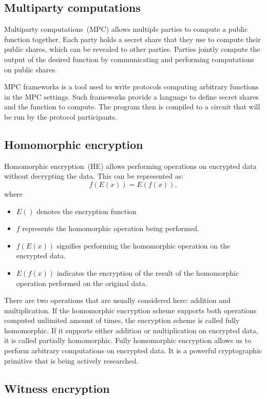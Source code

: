 \documentclass[
    9pt,            %
    report,        %
    affiltop,       %
]{art}
\begin{document}
\subsection{Multiparty computations}\label{MPC}

Multiparty computations~(MPC) allows multiple parties to compute a public function together. Each party holds a secret share that they use to compute their public shares, which can be revealed to other parties. Parties jointly compute the output of the desired function by communicating and performing computations on public shares.

MPC frameworks is a tool used to write protocols computing arbitrary functions in the MPC settings. Such frameworks provide a language to define secret shares and the function to compute. The program then is compiled to a circuit that will be run by the protocol participants.

\subsection{Homomorphic encryption}\label{HE}

Homomorphic encryption~(HE) allows performing operations on encrypted data without decrypting the data. This can be represented as: 
$$f(E(x)) = E(f(x)),$$ 
where
\begin{itemize}
\item $E()$ denotes the encryption function
\item $f$ represents the homomorphic operation being performed.
\item $f(E(x))$ signifies performing the homomorphic operation on the encrypted data.
\item $E(f(x))$ indicates the encryption of the result of the homomorphic operation performed on the original data.
\end{itemize}

There are two operations that are usually considered here: addition and multiplication. If the homomorphic encryption scheme supports both operations computed unlimited amount of times, the encryption scheme is called fully homomorphic. If it supports either addition or multiplication on encrypted data, it is called partially homomorphic. Fully homomorphic encryption allows us to perform arbitrary computations on encrypted data. It is a powerful cryptographic primitive that is being actively researched.

\subsection{Witness encryption}\label{WE}
\end{document}
